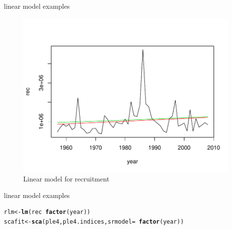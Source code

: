 \documentclass{beamer}\usepackage[]{graphicx}\usepackage[]{color}
\makeatletter
\def\maxwidth{ %
  \ifdim\Gin@nat@width>\linewidth
    \linewidth
  \else
    \Gin@nat@width
  \fi
}
\newcommand{\hlopt}[1]{\textcolor[rgb]{0,0,0}{#1}}%
\newcommand{\hlstd}[1]{\textcolor[rgb]{0.345,0.345,0.345}{#1}}%
\newcommand{\hlkwb}[1]{\textcolor[rgb]{0.69,0.353,0.396}{#1}}%
\newcommand{\hlkwc}[1]{\textcolor[rgb]{0.333,0.667,0.333}{#1}}%
\newcommand{\hlkwd}[1]{\textcolor[rgb]{0.737,0.353,0.396}{\textbf{#1}}}%
\newenvironment{kframe}{%
 \def\at@end@of@kframe{}%
 \ifinner\ifhmode%
  \def\at@end@of@kframe{\end{minipage}}%
  \begin{minipage}{\columnwidth}%
 \fi\fi%
 \def\FrameCommand##1{\hskip\@totalleftmargin \hskip-\fboxsep
 \colorbox{shadecolor}{##1}\hskip-\fboxsep
     \hskip-\linewidth \hskip-\@totalleftmargin \hskip\columnwidth}%
 \MakeFramed {\advance\hsize-\width
   \@totalleftmargin\z@ \linewidth\hsize
   \@setminipage}}%
 {\par\unskip\endMakeFramed%
 \at@end@of@kframe}
\newenvironment{knitrout}{}{} %
\makeatother
\begin{document}
\begin{frame}{linear model examples}

\begin{knitrout}
\color{fgcolor}\begin{figure}[]

\includegraphics[width=\maxwidth]{figure/unnamed-chunk-2} \caption[Linear model for recruitment]{Linear model for recruitment\label{fig:unnamed-chunk-2}}
\end{figure}


\end{knitrout}


\end{frame}

\begin{frame}{linear model examples}

\begin{knitrout}
\color{fgcolor}\begin{kframe}
\begin{alltt}
\hlstd{rlm} \hlkwb{<-} \hlkwd{lm}\hlstd{(rec} \hlopt{~} \hlkwd{factor}\hlstd{(year))}
\hlstd{scafit} \hlkwb{<-} \hlkwd{sca}\hlstd{(ple4, ple4.indices,} \hlkwc{srmodel} \hlstd{=} \hlopt{~}\hlkwd{factor}\hlstd{(year))}
\end{alltt}
\end{kframe}
\end{knitrout}


\end{frame}
\end{document}
